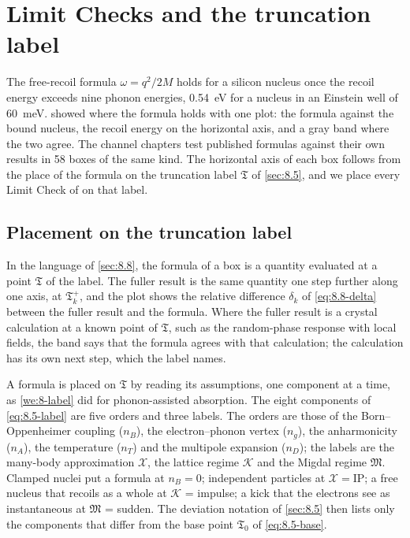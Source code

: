 \section{Limit Checks and the truncation label}\label{sec:9.4}

The free-recoil formula $\omega = q^2/2M$ holds for a silicon nucleus once the recoil energy exceeds nine phonon energies, \SI{0.54}{eV} for a nucleus in an Einstein well of \SI{60}{meV}.  showed where the formula holds with one plot: the formula against the bound nucleus, the recoil energy on the horizontal axis, and a gray band where the two agree. The channel chapters test published formulas against their own results in 58 boxes of the same kind. The horizontal axis of each box follows from the place of the formula on the truncation label $\mathfrak{T}$ of \cref{sec:8.5}, and we place every Limit Check of  on that label.

\subsection{Placement on the truncation label}\label{sec:9.4-place}

In the language of \cref{sec:8.8}, the formula of a box is a quantity evaluated at a point $\mathfrak{T}$ of the label. The fuller result is the same quantity one step further along one axis, at $\mathfrak{T}_k^+$, and the plot shows the relative difference $\delta_k$ of \cref{eq:8.8-delta} between the fuller result and the formula. Where the fuller result is a crystal calculation at a known point of $\mathfrak{T}$, such as the random-phase response with local fields, the band says that the formula agrees with that calculation; the calculation has its own next step, which the label names.

A formula is placed on $\mathfrak{T}$ by reading its assumptions, one component at a time, as \cref{we:8-label} did for phonon-assisted absorption. The eight components of \cref{eq:8.5-label} are five orders and three labels. The orders are those of the Born--Oppenheimer coupling ($n_B$), the electron--phonon vertex ($n_g$), the anharmonicity ($n_A$), the temperature ($n_T$) and the multipole expansion ($n_D$); the labels are the many-body approximation $\mathcal{X}$, the lattice regime $\mathcal{K}$ and the Migdal regime $\mathfrak{M}$. Clamped nuclei put a formula at $n_B = 0$; independent particles at $\mathcal{X} = \mathrm{IP}$; a free nucleus that recoils as a whole at $\mathcal{K}$ = impulse; a kick that the electrons see as instantaneous at $\mathfrak{M}$ = sudden. The deviation notation of \cref{sec:8.5} then lists only the components that differ from the base point $\mathfrak{T}_0$ of \cref{eq:8.5-base}.


